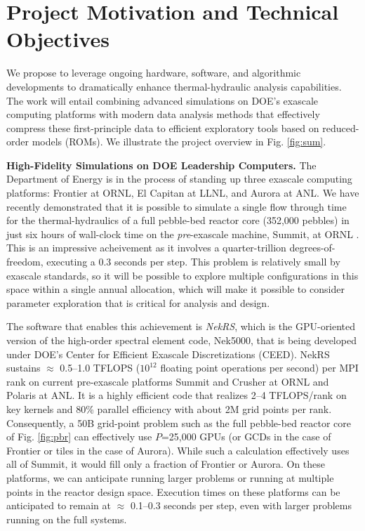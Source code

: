 \section{Project Motivation and Technical Objectives}

We propose to leverage ongoing hardware, software, and algorithmic developments
to dramatically enhance thermal-hydraulic analysis capabilities.  The work will
entail combining advanced simulations on DOE's exascale computing platforms
with modern data analysis methods that effectively compress these
first-principle data to efficient exploratory tools based on reduced-order
models (ROMs).
We illustrate the project overview in Fig. \ref{fig:sum}.

\noindent
{\bf High-Fidelity Simulations on DOE Leadership Computers.}
The Department of Energy is in the process of standing up three exascale
computing platforms: Frontier at ORNL, El Capitan at LLNL, and Aurora at ANL.
We have recently demonstrated that it is possible to simulate a single flow
through time for the thermal-hydraulics of a full pebble-bed reactor core
(352,000 pebbles) in just six hours of wall-clock time on the {\em
pre}-exascale machine, Summit, at ORNL \cite{sc22}.   This is an impressive
acheivement as it involves a quarter-trillion degrees-of-freedom, executing a
0.3 seconds per step.  This problem is relatively small by exascale standards,
so it will be possible to explore multiple configurations in this space within
a single annual allocation, which will make it possible to consider parameter
exploration that is critical for analysis and design.

The software that enables this achievement is {\em NekRS}, which is the
GPU-oriented version of the high-order spectral element code, Nek5000, that
is being developed under DOE's Center for Efficient Exascale Discretizations
(CEED). NekRS sustains $\approx$ 0.5--1.0 TFLOPS ($10^{12}$ floating point
operations per second) per MPI rank on current pre-exascale platforms Summit
and Crusher at ORNL and Polaris at ANL.  It is a highly efficient code that
realizes 2--4 TFLOPS/rank on key kernels and 80\% parallel efficiency with
about 2M grid points per rank.  Consequently, a 50B grid-point problem such as
the full pebble-bed reactor core of Fig. \ref{fig:pbr} can effectively use
$P$=25,000 GPUs (or GCDs in the case of Frontier or tiles in the case of
Aurora).  While such a calculation effectively uses all of Summit, it would
fill only a fraction of Frontier or Aurora.  On these platforms, we can
anticipate running larger problems or running at multiple points in the reactor
design space.  Execution times on these platforms can be anticipated to remain
at $\approx$ 0.1--0.3 seconds per step, even with larger problems
running on the full systems.


